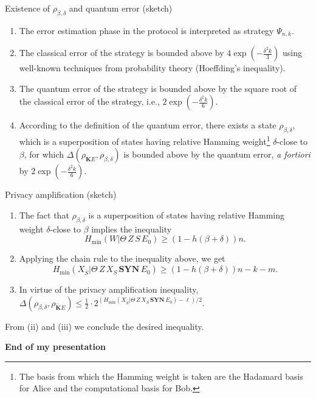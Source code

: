 \documentclass{beamer}
\begin{document}
\begin{frame}{Existence of $\rho_{\beta,\delta}$ and quantum error (sketch)}
\begin{enumerate}[label=(\roman*)]
\item The error estimation phase in the protocol is interpreted as strategy $\Psi_{n,k}$. 
\item The classical error of the strategy is bounded above by $4\exp\left( -\frac{\delta^2 k}{3} \right)$ using well-known techniques from probability theory (Hoeffding's inequality).
\item The quantum error of the strategy is bounded above by the square root of the classical error of the strategy, i.e., $2\exp\left( -\frac{\delta^2 k}{6} \right)$.
\item According to the definition of the quantum error, there exists a state $\rho_{\beta,\delta}$, which is a superposition of states having relative Hamming weight\footnote{The basis from which the Hamming weight is taken are the Hadamard basis for Alice and the computational
basis for Bob.} $\delta$-close to $\beta$, for which $\Delta\left( \rho_{\mathbf{K}E}, \rho_{\beta,\delta} \right)$ is bounded above by the quantum error, \emph{a fortiori} by $2\exp\left( -\frac{\delta^2 k}{6} \right)$.
\end{enumerate}
\end{frame}

\begin{frame}{Privacy amplification (sketch)}
\begin{enumerate}[label=(\roman*)]
\item The fact that $\rho_{\beta,\delta}$ is a superposition of states having relative Hamming weight $\delta$-close to $\beta$ implies the inequality
$$
H_{\min}(W|\Theta \, Z \, S \, E_0) \geq \left(1 - h(\beta + \delta) \right) n.
$$
\item Applying the chain rule to the inequality above, we get
$$
H_{\min}(X_{\overline{S}}|\Theta \, Z \, X_S \, \textbf{SYN} \, E_0) \geq \left(1 - h(\beta + \delta) \right) n - k - m.
$$

\item In virtue of the privacy amplification inequality, $\Delta\left(\rho_{\beta,\delta}, \rho_{\mathbf{\tilde{K}}E} \right) \leq \frac{1}{2}\cdot 2^{\left(H_{\min}(X_{\overline{S}}|\Theta \, Z \, X_S \, \textbf{SYN} \, E_0) - \ell \right)/2}$.
\end{enumerate}

From (ii) and (iii) we conclude the desired inequality.
\end{frame}

\begin{frame}
\begin{center}
\Large{\textbf{End of my presentation} }
\end{center}
\end{frame}
\end{document}
